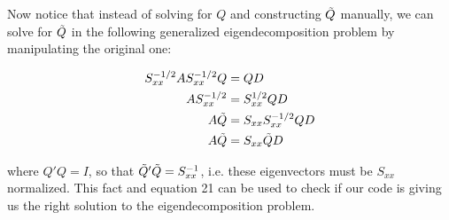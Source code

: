 \documentclass[12pt]{article}
\begin{document}
Now notice that instead of solving for $Q$ and constructing $\Tilde{Q}$ manually, we can solve for $\Tilde{Q}$ in the following generalized eigendecomposition problem by manipulating the original one:

\begin{align}
    S_{xx}^{-1/2} A     S_{xx}^{-1/2} Q &= Q D \\
    A  S_{xx}^{-1/2} &=     S_{xx}^{1/2} Q D \\
    A \Tilde{Q} &= S_{xx}     S_{xx}^{-1/2} Q D \\
    A \Tilde{Q} &= S_{xx} \Tilde{Q} D 
\end{align}

where $Q'Q = I$, so that $\Tilde{Q}'\Tilde{Q} = S_{xx}^{-1}$, i.e. these eigenvectors must be $S_{xx}$ normalized. This fact and equation 21 can be used to check if our code is giving us the right solution to the eigendecomposition problem. 
\end{document}

